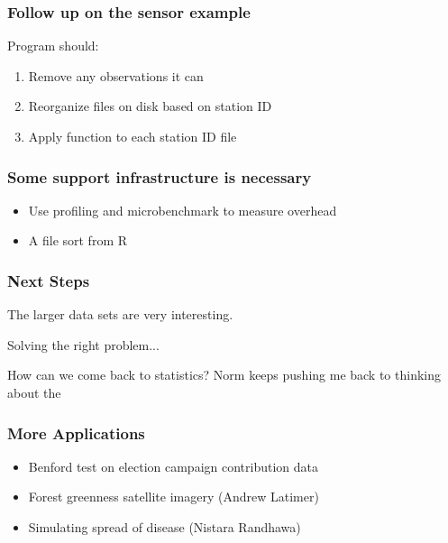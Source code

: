 \documentclass{beamer}
\begin{document}
\begin{frame}

    \frametitle{Follow up on the sensor example}

    Program should:

\begin{enumerate}
    \item Remove any observations it can
    \item Reorganize files on disk based on station ID
    \item Apply function to each station ID file
\end{enumerate}

\end{frame}
\begin{frame}

    \frametitle{Some support infrastructure is necessary}

\begin{itemize}
\item Use profiling and microbenchmark to measure overhead
\item A file sort from R
\end{itemize}


\end{frame}
\begin{frame}

    \frametitle{Next Steps}

    The larger data sets are very interesting. 

    Solving the right problem...
    
    How can we come back
    to statistics? Norm keeps pushing me back to thinking about the 

\end{frame}
\begin{frame}

    \frametitle{More Applications}

\begin{itemize}
    \item Benford test on election campaign contribution data
        \cite{tam2007breaking}
    \item Forest greenness satellite imagery (Andrew Latimer)
    \item Simulating spread of disease (Nistara Randhawa)
\end{itemize}

\end{frame}
\end{document}
